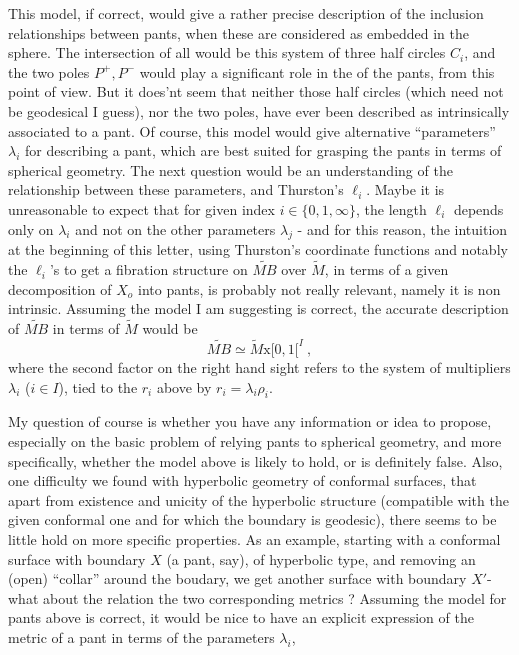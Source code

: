 This model, if correct, would give a rather precise description of the inclusion relationships between pants, when these are considered as embedded in the sphere. The intersection of all would be this system of three half circles $C_i$, and the two poles $P^+,P^-$ would play a significant role in the  of the pants, from this point of view. But it does'nt seem that neither those half circles (which need not be geodesical I guess), nor the two poles, have ever been described as intrinsically associated to a pant. Of course, this model would give alternative ``parameters'' $\lambda_i$ for describing a pant, which are best suited for grasping the pants in terms of spherical geometry. The next question would be an understanding of the relationship between these parameters, and Thurston's $\ell_i$. Maybe it is unreasonable to expect that for given index $i\in\{0,1,\infty\}$, the length $\ell_i$ depends only on $\lambda_i$ and not on the other parameters $\lambda_j$ - and for this reason,  the intuition at the beginning of this letter, using Thurston's coordinate functions and notably the $\ell_i$'s to get a fibration structure on $\widetilde{MB}$ over $\widetilde M$, in terms of a given decomposition of $X_o$ into pants, is probably not really relevant, namely it is non intrinsic. Assuming the model I am suggesting is correct, the accurate description  of $\widetilde{MB}$ in terms of $\widetilde M$ would be
\[
\widetilde{MB}\simeq\widetilde M\mathbin{\mathrm{x}}[0,1[^I\ ,
\]
where the second factor on the right hand sight refers to the system of multipliers $\lambda_i$ ($i\in I$), tied to the $r_i$ above by $r_i=\lambda_i\rho_i$.

My question of course is whether you have any information or idea to propose, especially on the basic problem of relying pants to spherical geometry, and more specifically, whether the model above is likely to hold, or is definitely false. Also, one difficulty we found with hyperbolic geometry of conformal surfaces, that apart from existence and unicity of the hyperbolic structure (compatible with the given conformal one and for which the boundary is geodesic), there seems to be little
hold on more specific properties. As an example, starting with a  conformal surface with boundary $X$ (a pant, say), of hyperbolic type, and removing an (open) ``collar'' around the boudary, we get another surface with boundary $X'$- what about the relation  the two corresponding metrics ? Assuming the model for pants above is correct, it would be nice to have an explicit expression of the metric of a pant in terms of the parameters $\lambda_i$,

